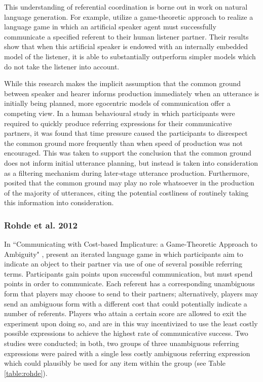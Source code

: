 \documentclass[12pt,a4paper]{article}
\begin{document}
This understanding of referential coordination is borne out in work on natural language generation. For example, \cite{golland2010} utilize a game-theoretic approach to realize a language game in which an artificial speaker agent must successfully communicate a specified referent to their human listener partner. Their results show that when this artificial speaker is endowed with an internally embedded model of the listener, it is able to substantially outperform simpler models which do not take the listener into account.

While this research makes the implicit assumption that the common ground between speaker and hearer informs production immediately when an utterance is initially being planned, more egocentric models of communication offer a competing view. In a human behavioural study \citep{horton1996} in which participants were required to quickly produce referring expressions for their communicative partners, it was found that time pressure caused the participants to disrespect the common ground more frequently than when speed of production was not encouraged. This was taken to support the conclusion that the common ground does not inform initial utterance planning, but instead is taken into consideration as a filtering mechanism during later-stage utterance production. Furthermore, \cite{horton1996} posited that the common ground may play no role whatsoever in the production of the majority of utterances, citing the potential costliness of routinely taking this information into consideration.

\subsubsection{Rohde et al. 2012}
In ``Communicating with Cost-based Implicature: a Game-Theoretic Approach to Ambiguity" \citeyearpar{rohde2012}, \citeauthor{rohde2012} present an iterated language game in which participants aim to indicate an object to their partner via use of one of several possible referring terms. Participants gain points upon successful communication, but must spend points in order to communicate. Each referent has a corresponding unambiguous form that players may choose to send to their partners; alternatively, players may send an ambiguous form with a different cost that could potentially indicate a number of referents. Players who attain a certain score are allowed to exit the experiment upon doing so, and are in this way incentivized to use the least costly possible expressions to achieve the highest rate of communicative success. Two studies were conducted; in both, two groups of three unambiguous referring expressions were paired with a single less costly ambiguous referring expression which could plausibly be used for any item within the group (see Table \ref{table:rohde}). 
\end{document}
